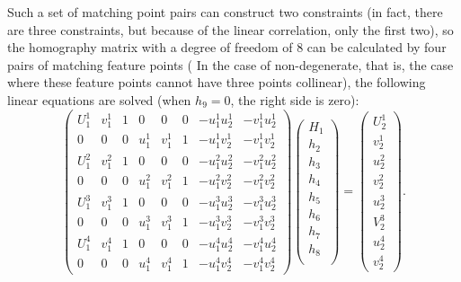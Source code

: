 Such a set of matching point pairs can construct two constraints (in fact, there are three constraints, but because of the linear correlation, only the first two), so the homography matrix with a degree of freedom of 8 can be calculated by four pairs of matching feature points ( In the case of non-degenerate, that is, the case where these feature points cannot have three points collinear), the following linear equations are solved (when $h_9 = 0$, the right side is zero):
\begin{equation}
\begin{pmatrix}
U_{1}^{1}& v_{1}^{1}& 1 & 0 & 0 & 0 & -u_{1}^{1}u_{2}^{1} & -v_{1}^ {1}u_{2}^{1}\\
0 & 0 & 0& u_{1}^{1}& v_{1}^{1}& 1 & -u_{1}^{1}v_{2}^{1} & -v_{1}^{ 1}v_{2}^{1}\\
U_{1}^{2}& v_{1}^{2}& 1 & 0 & 0 & 0 & -u_{1}^{2}u_{2}^{2} & -v_{1}^ {2}u_{2}^{2}\\
0 & 0 & 0& u_{1}^{2}& v_{1}^{2}& 1 & -u_{1}^{2}v_{2}^{2} & -v_{1}^{ 2}v_{2}^{2}\\
U_{1}^{3}& v_{1}^{3}& 1 & 0 & 0 & 0 & -u_{1}^{3}u_{2}^{3} & -v_{1}^ {3}u_{2}^{3}\\
0 & 0 & 0& u_{1}^{3}& v_{1}^{3}& 1 & -u_{1}^{3}v_{2}^{3} & -v_{1}^{ 3}v_{2}^{3}\\
U_{1}^{4}& v_{1}^{4}& 1 & 0 & 0 & 0 & -u_{1}^{4}u_{2}^{4} & -v_{1}^ {4}u_{2}^{4}\\
0 & 0 & 0& u_{1}^{4}& v_{1}^{4}& 1 & -u_{1}^{4}v_{2}^{4} & -v_{1}^{ 4}v_{2}^{4}
\end{pmatrix}
\begin{pmatrix}
 H_{1}\\h_{2}\\h_{3}\\ h_{4}\\h_{5}\\h_{6}\\ h_{7}\\h_{8}\\
\end{pmatrix}
=
\begin{pmatrix}
U_{2}^{1}\\ v_{2}^{1}\\ u_{2}^{2}\\ v_{2}^{2}\\u_{2}^{3}\\ V_{2}^{3}\\u_{2}^{4}\\ v_{2}^{4}
\end{pmatrix}.
\end{equation}

